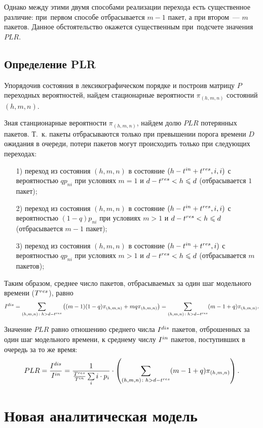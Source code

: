 Однако между этими двумя способами реализации перехода есть существенное различие: при~первом способе отбрасывается $m - 1$ пакет, а при втором~--- $m$ пакетов. Данное обстоятельство окажется существенным при~подсчете значения $PLR$.  

\subsection{Определение PLR}
Упорядочив состояния в лексикографическом порядке и построив матрицу $P$ переходных вероятностей, найдем стационарные вероятности $\pi_{(h,m,n)}$ состояний $(h,m,n)$.

Зная станционарные вероятности $\pi_{(h,m, n)}$, найдем долю $PLR$ потерянных пакетов. Т.~к. пакеты отбрасываются только при превышении порога времени $D$ ожидания в очереди, потери пакетов могут происходить только при следующих переходах:
\begin{itemize}
\item[1)]переход из состояния $(h, m, n)$ в состояние \mbox{$(h - t^{in} + t^{res}, i, i)$} с вероятностью $q p_{ni}$ при условиях $m = 1$ и $d - t^{res} < h \leqslant d$ (отбрасывается $1$ пакет);
\item[2)]переход из состояния $(h, m, n)$ в состояние \mbox{$(h - t^{in} + t^{res}, i, i)$} с вероятностью $(1 - q)p_{ni}$ при условиях $m > 1$ и $d - t^{res} < h \leqslant d$ (отбрасывается $m - 1$ пакет); 
\item[3)]переход из состояния $(h, m, n)$ в состояние \mbox{$(h - t^{in} + t^{res}, i)$} с вероятностью $q p_{ni}$ при условиях $m > 1$ и $d - t^{res} < h \leqslant d$ (отбрасывается $m$ пакетов);
\end{itemize}

Таким образом, среднее число пакетов, отбрасываемых за один шаг модельного времени ($T^{res}$), равно
$$
	I^{dis} = \sum\limits_{(h,m, n)\colon h > d - t^{res}} \left((m - 1)(1 - q)\pi_{(h,m,n)} + mq\pi_{(h,m,n)}\right) = 
	\sum\limits_{(h,m,n)\colon h > d - t^{res}} (m - 1 + q)\pi_{(h,m,n)}.
$$

Значение $PLR$ равно отношению среднего числа $I^{dis}$ пакетов, отброшенных за один шаг модельного времени, к среднему числу $I^{in}$ пакетов, поступивших в очередь за то же время:
$$
PLR = \frac{I^{dis}}{I^{in}} = \frac{1}{\frac{T^{res}}{T^{in}} \sum\limits_{i} i\cdot p_i} \cdot \left(\sum\limits_{(h,m,n)\colon h > d - t^{res}} (m - 1 + q)\pi_{(h,m,n)} \right).
$$

\section{Новая аналитическая модель} %
\label{DynamicModel}
